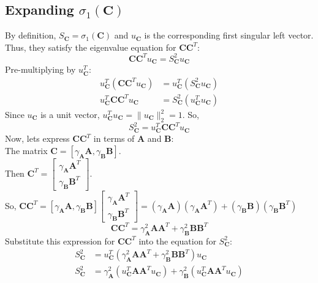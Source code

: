 \subsection{Expanding $\sigma_1(\mathbf{C})$}
By definition, $S_{\mathbf{C}} = \sigma_1(\mathbf{C})$ and $u_{\mathbf{C}}$ is the corresponding first
singular left vector. Thus, they satisfy the eigenvalue equation for $\mathbf{C}\mathbf{C}^T$:
\[ \mathbf{C}\mathbf{C}^Tu_{\mathbf{C}} = S_{\mathbf{C}}^2 u_{\mathbf{C}} \]
Pre-multiplying by $u_{\mathbf{C}}^T$:
\begin{align}
    u_{\mathbf{C}}^T(\mathbf{C}\mathbf{C}^T u_{\mathbf{C}}) &= u_{\mathbf{C}}^T(S_{\mathbf{C}}^2 u_{\mathbf{C}}) \\
    u_{\mathbf{C}}^T \mathbf{C}\mathbf{C}^T u_{\mathbf{C}} &= S_{\mathbf{C}}^2 (u_{\mathbf{C}}^T u_{\mathbf{C}})
\end{align}
Since $u_{\mathbf{C}}$ is a unit vector, $u_{\mathbf{C}}^T u_{\mathbf{C}} = \parallel u_{\mathbf{C}} \parallel_2^2 =
1$. So,
\[ S_{\mathbf{C}}^2 = u_{\mathbf{C}}^T \mathbf{C}\mathbf{C}^T u_{\mathbf{C}} \]
Now, lets express $\mathbf{C}\mathbf{C}^T$ in terms of $\mathbf{A}$ and $\mathbf{B}$:\\
The matrix $\mathbf{C} = [\gamma_{\mathbf{A}}\mathbf{A},\gamma_{\mathbf{B}}\mathbf{B}]$.\\
Then $\mathbf{C}^T = \begin{bmatrix} \gamma_{\mathbf{A}}\mathbf{A}^T \\ \gamma_{\mathbf{B}}\mathbf{B}^T \end{bmatrix}$.\\
So, $\mathbf{C}\mathbf{C}^T = [\gamma_{\mathbf{A}}\mathbf{A},\gamma_{\mathbf{B}}\mathbf{B}]\begin{bmatrix} \gamma_{\mathbf{A}}\mathbf{A}^T \\
\gamma_{\mathbf{B}}\mathbf{B}^T \end{bmatrix} = (\gamma_{\mathbf{A}}\mathbf{A})(\gamma_{\mathbf{A}}\mathbf{A}^T) +
(\gamma_{\mathbf{B}}\mathbf{B})(\gamma_{\mathbf{B}}\mathbf{B}^T)$
\[ \mathbf{C}\mathbf{C}^T = \gamma_{\mathbf{A}}^2\mathbf{A}\mathbf{A}^T + \gamma_{\mathbf{B}}^2\mathbf{B}\mathbf{B}^T \]
Substitute this expression for $\mathbf{C}\mathbf{C}^T$ into the equation for $S_{\mathbf{C}}^2$:
\begin{align}
    S_{\mathbf{C}}^2 &= u_{\mathbf{C}}^T (\gamma_{\mathbf{A}}^2\mathbf{A}\mathbf{A}^T + \gamma_{\mathbf{B}}^2\mathbf{B}\mathbf{B}^T)u_{\mathbf{C}} \\
    S_{\mathbf{C}}^2 &= \gamma_{\mathbf{A}}^2(u_{\mathbf{C}}^T\mathbf{A}\mathbf{A}^Tu_{\mathbf{C}}) + \gamma_{\mathbf{B}}^2(u_{\mathbf{C}}^T\mathbf{A}\mathbf{A}^Tu_{\mathbf{C}})
\end{align}
